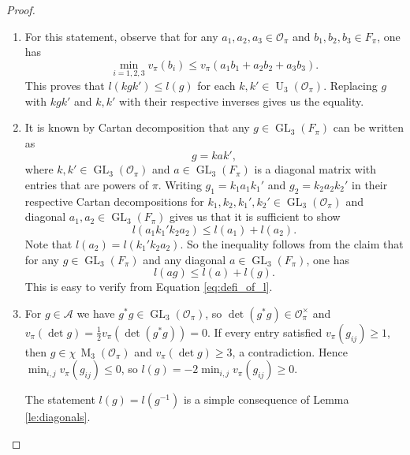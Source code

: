 \documentclass{eptcs}
\theoremstyle{remark}
\theoremstyle{definition}
\DeclareMathOperator{\GL}{GL}
\DeclareMathOperator{\U}{U}
\DeclareMathOperator{\M}{M}
\begin{document}
\begin{proof}
    \begin{enumerate}

    \item 
    For this statement, observe that for any $a_{1}, a_{2}, a_{3} \in \mathcal{O}_{\pi}$ and $b_{1},b_{2},b_{3} \in F_{\pi} $, one has 
    \begin{equation}
	\min_{i=1,2,3} v_{\pi}(b_{i}) \leq v_{\pi}(a_{1} b_{1} + a_{2} b_{2} + a_{3} b_{3}).
    \end{equation}
    This proves that $l(k g k') \leq l(g)$ for each $k,k' \in \U_{3}(\mathcal{O}_{\pi})$. Replacing $g$ with $k g k'$ and $k,k'$ with their respective inverses gives us the equality.

    \item 
    It is known by Cartan decomposition that any $g \in \GL_{3}(F_{\pi})$ can be written as 
    \begin{equation}
	g = k a k',
    \end{equation}
    where $k,k' \in \GL_{3}(\mathcal{O}_{\pi})$ and $a \in \GL_{3}(F_{\pi})$ is a diagonal matrix with entries that are powers of $\pi$. 
    Writing $g_{1} = k_{1} a_{1} k_{1}'$ and $g_{2} = k_{2} a_{2} k_{2}'$ in their respective Cartan decompositions for $k_{1},k_{2},k_{1}',k_{2}'\in \GL_{3}(\mathcal{O}_{\pi})$ and diagonal $a_{1},a_{2} \in \GL_{3}(F_{\pi})$ gives us that it is sufficient to show
    \begin{equation}
        l(a_{1} k_{1}' k_{2} a_{2}) \leq l(a_{1}) + l(a_{2}).
    \end{equation}
    Note that $l(a_{2}) = l(k_{1}' k_{2} a_{2})$. So the inequality follows from the claim that for any $g \in \GL_{3}(F_{\pi})$ and any diagonal $a \in \GL_{3}(F_{\pi})$, one has 
    \begin{equation}
        l(a g) \leq l(a) + l(g).
    \end{equation}
    This is easy to verify from Equation \ref{eq:defi_of_l}.
        \item 

    For $g \in \mathcal{A}$ we have $g^{*}g \in \GL_{3}(\mathcal{O}_{\pi})$, so $\det(g^{*}g) \in \mathcal{O}_{\pi}^{\times}$ and $v_{\pi}(\det g) = \tfrac{1}{2}v_{\pi}(\det(g^{*}g)) = 0$. If every entry satisfied $v_{\pi}(g_{ij}) \geq 1$, then $g \in \chi\,\M_{3}(\mathcal{O}_{\pi})$ and $v_{\pi}(\det g) \geq 3$, a contradiction. Hence $\min_{i,j} v_{\pi}(g_{ij}) \leq 0$, so $l(g) = -2\min_{i,j} v_{\pi}(g_{ij}) \geq 0$.

    The statement $l(g) = l(g^{-1})$ is a simple consequence of Lemma \ref{le:diagonals}.


\end{enumerate}
\end{proof}
\end{document}
